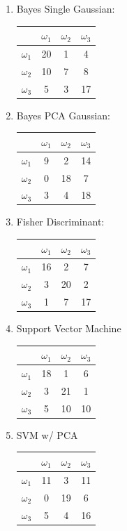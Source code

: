 \documentclass[a4paper]{article}
\begin{document}
\begin{multicols}{2}
\begin{enumerate}

\item Bayes Single Gaussian:

\begin{tabular}{ | l | c | c | c | }
\hline
& $\omega_1$ & $\omega_2$ & $\omega_3$ \\
\hline
  $\omega_1$ & 20 & 1 & 4 \\
\hline
  $\omega_2$ & 10 & 7 & 8 \\
\hline
  $\omega_3$ & 5 & 3 & 17 \\
\hline
\end{tabular}
\columnbreak
\item Bayes PCA Gaussian:

\begin{tabular}{ | l | c | c | c | }
\hline
& $\omega_1$ & $\omega_2$ & $\omega_3$ \\
\hline
  $\omega_1$ & 9 & 2 & 14 \\
\hline
  $\omega_2$ & 0 & 18 & 7 \\
\hline
  $\omega_3$ & 3 & 4 & 18 \\
\hline
\end{tabular}
\columnbreak
\item Fisher Discriminant:

\begin{tabular}{ | l | c | c | c | }
\hline
& $\omega_1$ & $\omega_2$ & $\omega_3$ \\
\hline
  $\omega_1$ & 16 & 2 & 7 \\
\hline
  $\omega_2$ & 3 & 20 & 2 \\
\hline
  $\omega_3$ & 1 & 7 & 17 \\
\hline
\end{tabular}

\item Support Vector Machine

\begin{tabular}{ | l | c | c | c | }
\hline
& $\omega_1$ & $\omega_2$ & $\omega_3$ \\
\hline
  $\omega_1$ & 18 & 1 & 6 \\
\hline
  $\omega_2$ & 3 & 21 & 1 \\
\hline
  $\omega_3$ & 5 & 10 & 10 \\
\hline
\end{tabular}

\item SVM w/ PCA

\begin{tabular}{ | l | c | c | c | }
\hline
& $\omega_1$ & $\omega_2$ & $\omega_3$ \\
\hline
  $\omega_1$ & 11 & 3 & 11 \\
\hline
  $\omega_2$ & 0 & 19 & 6 \\
\hline
  $\omega_3$ & 5 & 4 & 16 \\
\hline
\end{tabular}


\end{enumerate}
\end{multicols}
\end{document}
